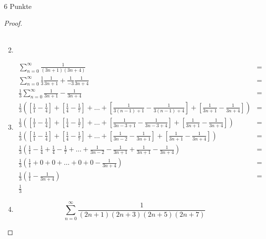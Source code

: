 \documentclass{problemset}
\begin{document}
\begin{problem}{6 Punkte}
\begin{proof}
\begin{enumerate}
\begin{align}
		      \end{align}
		\item
		\item \begin{align*}
			      \sum_{n=0}^{\infty} \frac{1}{(3n + 1)(3n + 4)}                                                                                                                                                                                 & = \\
			      \sum_{n=0}^{\infty} \frac{1}{3}\frac{1}{3n + 1} + \frac{1}{-3}\frac{1}{3n + 4}                                                                                                                                                 & = \\
			      \frac{1}{3} \sum_{n=0}^{\infty} \frac{1}{3n + 1} - \frac{1}{3n + 4}                                                                                                                                                            & = \\
			      \frac{1}{3} \left(\left[\frac{1}{1} - \frac{1}{4}\right] + \left[\frac{1}{4} - \frac{1}{7}\right] + \ldots + \left[\frac{1}{3(n-1) + 1} - \frac{1}{3(n-1) +4}\right] + \left[\frac{1}{3n + 1} - \frac{1}{3n +4}\right] \right) & = \\
			      \frac{1}{3} \left(\left[\frac{1}{1} - \frac{1}{4}\right] + \left[\frac{1}{4} - \frac{1}{7}\right] + \ldots + \left[\frac{1}{3n -3 + 1} - \frac{1}{3n -3 + 4}\right] + \left[\frac{1}{3n + 1} - \frac{1}{3n +4}\right] \right)  & = \\
			      \frac{1}{3} \left(\left[\frac{1}{1} - \frac{1}{4}\right] + \left[\frac{1}{4} - \frac{1}{7}\right] + \ldots + \left[\frac{1}{3n - 2} - \frac{1}{3n + 1}\right] + \left[\frac{1}{3n + 1} - \frac{1}{3n +4}\right] \right)        & = \\
			      \frac{1}{3} \left(\frac{1}{1} - \frac{1}{4} + \frac{1}{4} - \frac{1}{7} + \ldots + \frac{1}{3n - 2} - \frac{1}{3n + 1} + \frac{1}{3n + 1} - \frac{1}{3n +4} \right)                                                            & = \\
			      \frac{1}{3} \left(\frac{1}{1} + 0 + 0 + \ldots + 0 + 0 - \frac{1}{3n +4} \right)                                                                                                                                               & = \\
			      \frac{1}{3} \left(\frac{1}{1} - \frac{1}{3n +4} \right)                                                                                                                                                                        & = \\
			      \frac{1}{3}
		      \end{align*}
		\item \[
			      \sum_{n=0}^{\infty} \frac{1}{(2n+1)(2n+3)(2n+5)(2n+7)}
		      \]
	\end{enumerate}
\end{proof}
\end{problem}
\end{document}
